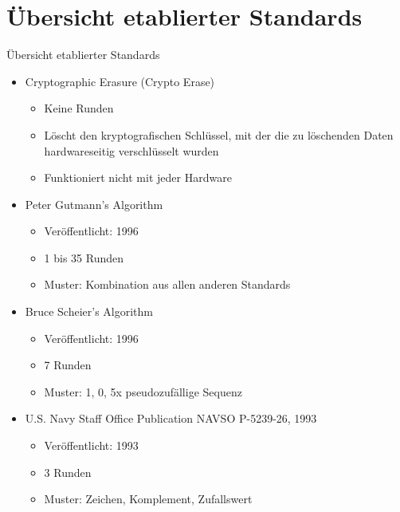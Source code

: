 \documentclass[aspectratio=169]{beamer}
\begin{document}
\section{Übersicht etablierter Standards}
\begin{frame}{Übersicht etablierter Standards}
	\begin{itemize}
		\item Cryptographic Erasure (Crypto Erase)
			\begin{itemize}
				\item Keine Runden
				\item Löscht den kryptografischen Schlüssel, mit der die zu
					löschenden Daten hardwareseitig verschlüsselt wurden
				\item Funktioniert nicht mit jeder Hardware
			\end{itemize}
		\item Peter Gutmann's Algorithm
			\begin{itemize}
				\item Veröffentlicht: 1996
				\item 1 bis 35 Runden
				\item Muster: Kombination aus allen anderen Standards
			\end{itemize}
		\item Bruce Scheier's Algorithm
			\begin{itemize}
				\item Veröffentlicht: 1996
				\item 7 Runden
				\item Muster: 1, 0, 5x pseudozufällige Sequenz
			\end{itemize}
		\item U.S. Navy Staff Office Publication NAVSO P-5239-26, 1993
			\begin{itemize}
				\item Veröffentlicht: 1993
				\item 3 Runden
				\item Muster: Zeichen, Komplement, Zufallswert
			\end{itemize}
	\end{itemize}
\end{frame}
\end{document}
